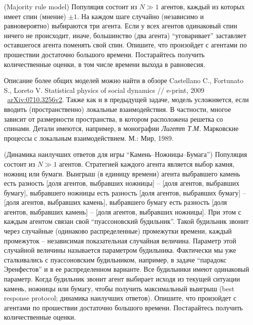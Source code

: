\begin{problem} (Majority rule model) 
Популяция состоит из $N\gg 1$ 
агентов, каждый из которых имеет спин (мнение) $\pm 1$. На каждом шаге 
случайно (независимо и равновероятно) выбираются три агента. Если у всех 
агентов одинаковый спин ничего не происходит, иначе, большинство (два 
агента) ``уговаривает'' заставляет оставшегося агента поменять свой спин. 
Опишите, что произойдет с агентами по прошествии достаточно большого 
времени. Постарайтесь получить количественные оценки, в том числе времени 
выхода в равновесия.
\end{problem}

\begin{remark}
Описание более общих моделей можно найти в обзоре 
{Castellano C., Fortunato S., Loreto V. }Statistical physics of social dynamics // e-print, 2009 ~\underline 
{arXiv:0710.3256v2}. Также как и в предыдущей задаче, модель усложняется, 
если вводить (пространственно) локальные взаимодействия. В частности, многое 
зависит от размерности пространства, в котором расположена решетка со 
спинами. Детали имеются, например, в монографии \textit{Лигетт Т.М.} Марковские процессы с 
локальным взаимодействием. М.: Мир, 1989. 
\end{remark}

\begin{problem}\Star(Динамика наилучших ответов для игры 
``Камень--Ножницы--Бумага'')  Популяция состоит из $N\gg 1$ агентов. 
Стратегией каждого агента является выбор камня, ножниц или бумаги. Выигрыш 
(в единицу времени) агента выбравшего камень есть разность [доля агентов, 
выбравших ножницы] -- [доля агентов, выбравших бумагу], выбравшего ножницы есть 
разность [доля агентов, выбравших бумагу] -- [доля агентов, выбравших камень], 
выбравшего бумагу есть разность [доля агентов, выбравших камень] -- [доля 
агентов, выбравших ножницы]. При этом с каждым агентом связан свой 
``пуассоновский будильник''. Такой будильник звонит через 
случайные (одинаково распределенные) промежутки времени, каждый промежуток 
-- независимая показательная случайная величина. Параметр этой случайной 
величины называется параметром будильника. Фактически мы уже сталкивались с 
пуассоновским будильником, например, в задаче ``парадокс Эренфестов'' и в ее 
распределенном варианте. Все будильники имеют одинаковый параметр. Когда 
будильник звонит агент выбирает исходя из текущей ситуации камень, ножницы 
или бумагу, чтобы получить максимальный выигрыш (best response protocol; 
динамика наилучших ответов). Опишите, что произойдет с агентами по 
прошествии достаточно большого времени. Постарайтесь получить количественные 
оценки.
\end{problem}

